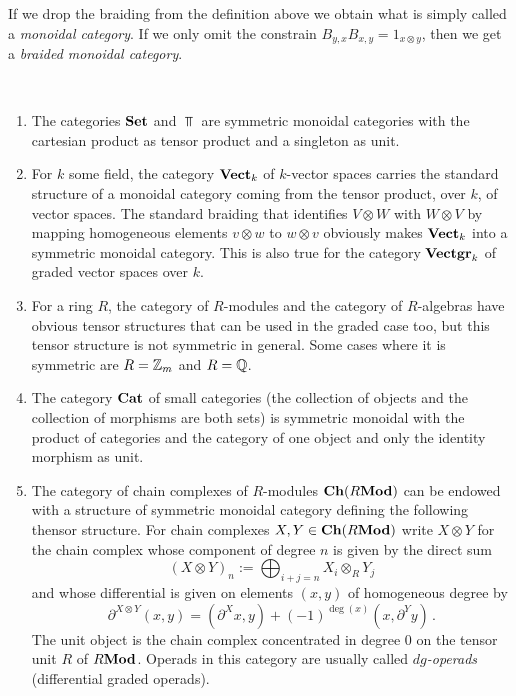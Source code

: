 \documentclass[TFM.tex]{subfiles}
\begin{document}
If we drop the braiding from the definition above we obtain what is simply called a \emph{monoidal category}. If we only omit the constrain $B_{y,x}B_{x,y}=1_{x\otimes y}$, then we get a \emph{braided monoidal category}.

\begin{ex}\
\begin{enumerate}
\item The categories $\mathrm{\mathbf{Set}}$ and $\Top$ are symmetric monoidal categories with the cartesian product as tensor product and a singleton as unit. 
\item For $k$ some field, the category $\mathrm{\mathbf{Vect}}_k$ of $k$-vector spaces carries the standard structure of a monoidal category coming from the tensor product, over $k$, of vector spaces. The standard braiding that identifies $V\otimes W$ with $W\otimes V$ by mapping homogeneous elements $v\otimes w$ to $w\otimes v$ obviously makes $\mathrm{\mathbf{Vect}}_k$ into a symmetric monoidal category. This is also true for the category $\mathrm{\mathbf{Vectgr}}_k$ of graded vector spaces over $k$. 

\item For a ring $R$, the category of $R$-modules and the category of $R$-algebras have obvious tensor structures that can be used in the graded case too, but this tensor structure is not symmetric in general. Some cases where it is symmetric are $R=\mathbb{Z}_m$ and $R=\mathbb{Q}$. %

\item The category $\mathrm{\mathbf{Cat}}$ of small categories (the collection of objects and the collection of morphisms are both sets) is symmetric monoidal with the product of categories and the category of one object and only the identity morphism as unit.


\item The category of chain complexes of $R$-modules $\mathrm{\mathbf{Ch}}(R\mathrm{\mathbf{Mod}})$ can be endowed with a structure of symmetric monoidal category defining the following thensor structure. For chain complexes $X,Y\in\mathrm{\mathbf{Ch}}(R\mathrm{\mathbf{Mod}})$ write $X\otimes Y$ for the chain complex whose component of degree $n$ is given by the direct sum
\[
(X \otimes Y)_n := \bigoplus_{i + j = n} X_i \otimes_R Y_j
\]
and whose differential is given on elements $(x,y)$ of homogeneous degree by
\[
\partial^{X \otimes Y} (x, y) = (\partial^X x, y) + 
  (-1)^{\deg(x)} (x, \partial^Y y)
  \,.
\]
The unit object is the chain complex concentrated in degree 0 on the tensor unit $R$ of $R\mathrm{\mathbf{Mod}}$. Operads in this category are usually called \emph{$dg$-operads} (differential graded operads). 


\end{enumerate}
\end{ex}
\end{document}
